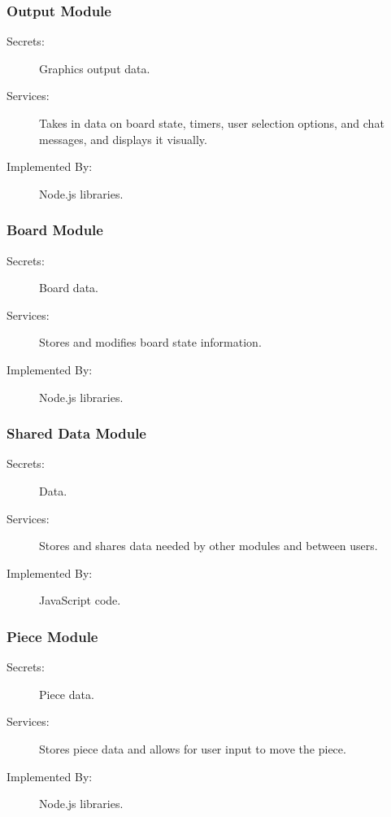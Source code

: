 \documentclass[12pt, titlepage]{article}
\begin{document}
    \subsubsection{Output Module \label{mOutput}} 
    \begin{description}
    \item[Secrets:] Graphics output data.
    \item[Services:] Takes in data on board state, timers, user selection options, and chat messages, and displays it visually.
    \item[Implemented By:] Node.js libraries.
    \end{description}
    
    \subsubsection{Board Module \label{mBoard}}
    \begin{description}
    \item[Secrets:] Board data.
    \item[Services:] Stores and modifies board state information.
    \item[Implemented By:] Node.js libraries.
    \end{description}
    
    \subsubsection{Shared Data Module \label{mSharedData}}
    \begin{description}
    \item[Secrets:] Data.
    \item[Services:] Stores and shares data needed by other modules and between users.
    \item[Implemented By:] JavaScript code.
    \end{description}
    
    \subsubsection{Piece Module \label{mPiece}}
    \begin{description}
    \item[Secrets:] Piece data.
    \item[Services:] Stores piece data and allows for user input to move the piece.
    \item[Implemented By:] Node.js libraries.
    \end{description}
    
\end{document}
